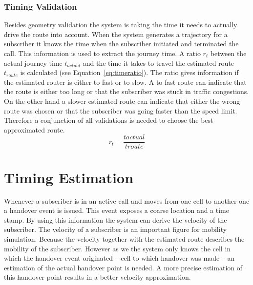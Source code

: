 \documentclass[master,english]{hgbthesis}
\begin{document}
\subsubsection{Timing Validation}
Besides geometry validation the system is taking the time it needs to actually drive the route into account. When the system generates a trajectory for a subscriber it knows the time when the subscriber initiated and terminated the call. This information is used to extract the journey time. A ratio $r_t$ between the actual journey time $t_{actual}$ and the time it takes to travel the estimated route $t_{route}$ is calculated (see Equation~\ref{eq:timeratio}). The ratio gives information if the estimated router is either to fast or to slow. A to fast route can indicate that the route is either too long or that the subscriber was stuck in traffic congestions. On the other hand a slower estimated route can indicate that either the wrong route was chosen or that the subscriber was going faster than the speed limit. Therefore a conjunction of all validations is needed to choose the best approximated route.
\begin{equation}
	r_{t}=\frac{t{actual}}{t{route}}
	\label{eq:timeratio}
\end{equation}
\section{Timing Estimation}
\label{sec:timing-estimation}
Whenever a subscriber is in an active call and moves from one cell to another one a handover event is issued. This event exposes a coarse location and a time stamp. By using this information the system can derive the velocity of the subscriber. The velocity of a subscriber is an important figure for mobility simulation. Because the velocity together with the estimated route describes the mobility of the subscriber. However as we the system only knows the cell in which the handover event originated -- cell to which handover was made -- an estimation of the actual handover point is needed. A more precise estimation of this handover point results in a better velocity approximation.
\end{document}
